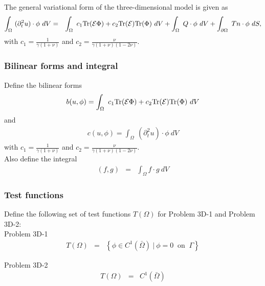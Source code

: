 \documentclass[../../main.tex]{subfiles}
\begin{document}
The general variational form of the three-dimensional model is given as
\begin{eqnarray*}
	\int_\Omega~ (\partial^2_t u) \cdot \phi~dV & = & \int_\Omega~c_1\textrm{Tr}({\cal E}\Phi)+
	c_2\textrm{Tr}({\cal E}) \textrm{Tr}(\Phi) ~dV + \int_\Omega~ Q \cdot \phi~dV +
	\int_{\partial \Omega}~Tn \cdot \phi~dS,
\end{eqnarray*}
with $ \displaystyle c_1 = \frac{1}{\gamma(1+\nu)}$ and $\displaystyle c_2 = \frac{\nu}{\gamma(1+\nu)(1-2\nu)}$.\\

\subsubsection{Bilinear forms and integral}\label{sssec:3D_Model:BilinearForm}
Define the bilinear forms
\begin{eqnarray}
	b(u,\phi) = \int_\Omega~c_1\textrm{Tr}({\cal E}\Phi)+ c_2\textrm{Tr}({\cal E})
	\textrm{Tr}(\Phi) ~dV \label{eq:3D_Model:Bilinear}
\end{eqnarray}\label{sym:b}
and
\begin{eqnarray}
	c(u,\phi) = \int_\Omega~ (\partial^2_t u) \cdot \phi~dV \label{eq:3D_Model:Bilinear_c}
\end{eqnarray}
with $\displaystyle c_1 = \frac{1}{\gamma(1+\nu)}$ and $\displaystyle c_2 = \frac{\nu}{\gamma(1+\nu)(1-2\nu)}$.\\

Also define the integral
\begin{eqnarray}
	(f,g) &=& \int_{\Omega} f\cdot g \ dV \label{eq:3D_Model:Bilinear_int}
\end{eqnarray}

\subsubsection{Test functions}\label{sssec:3D_Model:TestFunction}
Define the following set of test functions $T(\Omega)$ for Problem 3D-1 and
Problem 3D-2:\\

Problem 3D-1
\begin{eqnarray*}
	T(\Omega) & = & \left\{ \phi \in C^1(\bar{\Omega}) \ | \ \phi = 0 \ \textrm{ on } \ \Gamma \right\}
\end{eqnarray*}\label{sym:TOmega}

Problem 3D-2
\begin{eqnarray*}
	T(\Omega) & = &  C^1(\bar{\Omega})
\end{eqnarray*}
\end{document}
